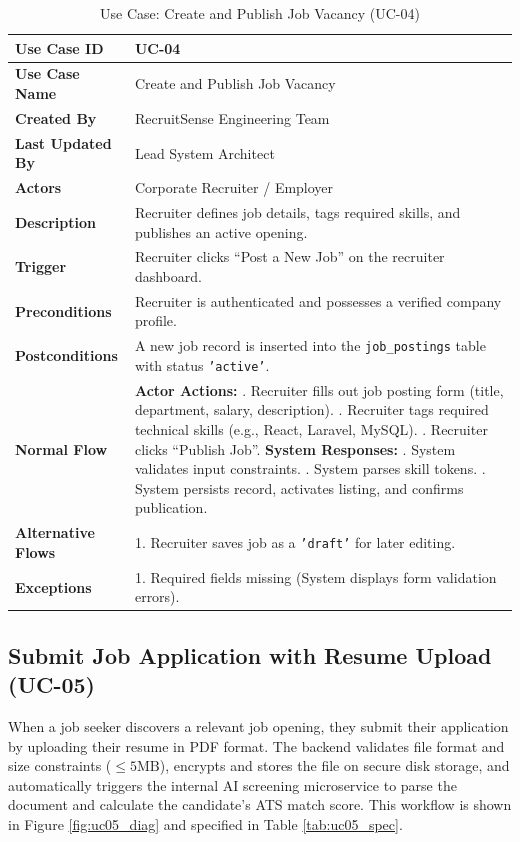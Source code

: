\begin{table}[h!]
\centering
\small
\caption{Use Case: Create and Publish Job Vacancy (UC-04)}
\label{tab:uc04_spec}
\begin{tabular}{|p{3.5cm}|p{11.5cm}|}
\hline
\textbf{Use Case ID} & UC-04 \\ \hline
\textbf{Use Case Name} & Create and Publish Job Vacancy \\ \hline
\textbf{Created By} & RecruitSense Engineering Team \\ \hline
\textbf{Last Updated By} & Lead System Architect \\ \hline
\textbf{Actors} & Corporate Recruiter / Employer \\ \hline
\textbf{Description} & Recruiter defines job details, tags required skills, and publishes an active opening. \\ \hline
\textbf{Trigger} & Recruiter clicks ``Post a New Job'' on the recruiter dashboard. \\ \hline
\textbf{Preconditions} & Recruiter is authenticated and possesses a verified company profile. \\ \hline
\textbf{Postconditions} & A new job record is inserted into the \texttt{job\_postings} table with status \texttt{'active'}. \\ \hline
\textbf{Normal Flow} & 
\textbf{Actor Actions:} \newline
1. Recruiter fills out job posting form (title, department, salary, description). \newline
3. Recruiter tags required technical skills (e.g., React, Laravel, MySQL). \newline
5. Recruiter clicks ``Publish Job''. \newline
\textbf{System Responses:} \newline
2. System validates input constraints. \newline
4. System parses skill tokens. \newline
6. System persists record, activates listing, and confirms publication. \\ \hline
\textbf{Alternative Flows} & 1. Recruiter saves job as a \texttt{'draft'} for later editing. \\ \hline
\textbf{Exceptions} & 1. Required fields missing (System displays form validation errors). \\ \hline
\end{tabular}
\end{table}

\subsection{Submit Job Application with Resume Upload (UC-05)}
When a job seeker discovers a relevant job opening, they submit their application by uploading their resume in PDF format. The backend validates file format and size constraints ($\le 5\text{MB}$), encrypts and stores the file on secure disk storage, and automatically triggers the internal AI screening microservice to parse the document and calculate the candidate's ATS match score. This workflow is shown in Figure \ref{fig:uc05_diag} and specified in Table \ref{tab:uc05_spec}.

